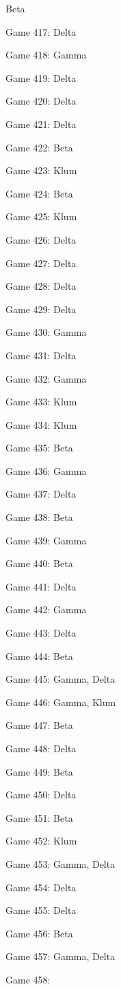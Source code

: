\documentclass{article}
\begin{document}
\begin{multicols}{3}
\begin{compactitem}
Beta
\item Game 417:
Delta
\item Game 418:
Gamma
\item Game 419:
Delta
\item Game 420:
Delta
\item Game 421:
Delta
\item Game 422:
Beta
\item Game 423:
Klum
\item Game 424:
Beta
\item Game 425:
Klum
\item Game 426:
Delta
\item Game 427:
Delta
\item Game 428:
Delta
\item Game 429:
Delta
\item Game 430:
Gamma
\item Game 431:
Delta
\item Game 432:
Gamma
\item Game 433:
Klum
\item Game 434:
Klum
\item Game 435:
Beta
\item Game 436:
Gamma
\item Game 437:
Delta
\item Game 438:
Beta
\item Game 439:
Gamma
\item Game 440:
Beta
\item Game 441:
Delta
\item Game 442:
Gamma
\item Game 443:
Delta
\item Game 444:
Beta
\item Game 445:
Gamma, Delta
\item Game 446:
Gamma, Klum
\item Game 447:
Beta
\item Game 448:
Delta
\item Game 449:
Beta
\item Game 450:
Delta
\item Game 451:
Beta
\item Game 452:
Klum
\item Game 453:
Gamma, Delta
\item Game 454:
Delta
\item Game 455:
Delta
\item Game 456:
Beta
\item Game 457:
Gamma, Delta
\item Game 458:

\end{compactitem}
\end{multicols}
\end{document}
